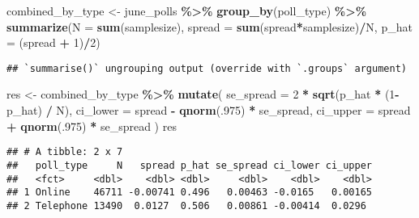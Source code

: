 \documentclass[
]{article}
\newenvironment{Shaded}{\begin{snugshade}}{\end{snugshade}}
\newcommand{\DataTypeTok}[1]{\textcolor[rgb]{0.13,0.29,0.53}{#1}}
\newcommand{\DecValTok}[1]{\textcolor[rgb]{0.00,0.00,0.81}{#1}}
\newcommand{\KeywordTok}[1]{\textcolor[rgb]{0.13,0.29,0.53}{\textbf{#1}}}
\newcommand{\NormalTok}[1]{#1}
\newcommand{\OperatorTok}[1]{\textcolor[rgb]{0.81,0.36,0.00}{\textbf{#1}}}
\newcommand{\StringTok}[1]{\textcolor[rgb]{0.31,0.60,0.02}{#1}}
\begin{document}
\begin{Shaded}
\begin{Highlighting}[]
\NormalTok{combined\_by\_type \textless{}{-}}\StringTok{ }\NormalTok{june\_polls }\OperatorTok{\%\textgreater{}\%}
\StringTok{        }\KeywordTok{group\_by}\NormalTok{(poll\_type) }\OperatorTok{\%\textgreater{}\%}
\StringTok{        }\KeywordTok{summarize}\NormalTok{(}\DataTypeTok{N =} \KeywordTok{sum}\NormalTok{(samplesize),}
                  \DataTypeTok{spread =} \KeywordTok{sum}\NormalTok{(spread}\OperatorTok{*}\NormalTok{samplesize)}\OperatorTok{/}\NormalTok{N,}
                  \DataTypeTok{p\_hat =}\NormalTok{ (spread }\OperatorTok{+}\StringTok{ }\DecValTok{1}\NormalTok{)}\OperatorTok{/}\DecValTok{2}\NormalTok{)}
\end{Highlighting}
\end{Shaded}

\begin{verbatim}
## `summarise()` ungrouping output (override with `.groups` argument)
\end{verbatim}

\begin{Shaded}
\begin{Highlighting}[]
\NormalTok{res \textless{}{-}}\StringTok{ }\NormalTok{combined\_by\_type }\OperatorTok{\%\textgreater{}\%}
\StringTok{  }\KeywordTok{mutate}\NormalTok{(}
    \DataTypeTok{se\_spread =} \DecValTok{2} \OperatorTok{*}\StringTok{ }\KeywordTok{sqrt}\NormalTok{(p\_hat }\OperatorTok{*}\StringTok{ }\NormalTok{(}\DecValTok{1}\OperatorTok{{-}}\NormalTok{p\_hat) }\OperatorTok{/}\StringTok{ }\NormalTok{N),}
    \DataTypeTok{ci\_lower =}\NormalTok{ spread }\OperatorTok{{-}}\StringTok{ }\KeywordTok{qnorm}\NormalTok{(.}\DecValTok{975}\NormalTok{) }\OperatorTok{*}\StringTok{ }\NormalTok{se\_spread,}
    \DataTypeTok{ci\_upper =}\NormalTok{ spread }\OperatorTok{+}\StringTok{ }\KeywordTok{qnorm}\NormalTok{(.}\DecValTok{975}\NormalTok{) }\OperatorTok{*}\StringTok{ }\NormalTok{se\_spread}
\NormalTok{    )}
\NormalTok{res}
\end{Highlighting}
\end{Shaded}

\begin{verbatim}
## # A tibble: 2 x 7
##   poll_type     N   spread p_hat se_spread ci_lower ci_upper
##   <fct>     <dbl>    <dbl> <dbl>     <dbl>    <dbl>    <dbl>
## 1 Online    46711 -0.00741 0.496   0.00463 -0.0165   0.00165
## 2 Telephone 13490  0.0127  0.506   0.00861 -0.00414  0.0296
\end{verbatim}
\end{document}
